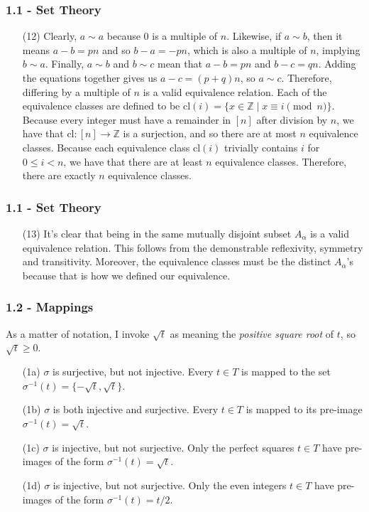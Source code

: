 \documentclass{beamer}
\begin{document}
\begin{frame}
\frametitle{1.1 - Set Theory}
\small
\begin{enumerate}
	\item[(12)] Clearly, $a\sim a$ because $0$ is a multiple of $n$. Likewise, if $a\sim b$, then it means $a - b = pn$ and so $b - a = -pn$, which is also a multiple of $n$, implying $b \sim a$. Finally, $a\sim b$ and $b\sim c$ mean that $a - b = pn$ and $b - c = qn$. Adding the equations together gives us $a - c = (p + q)n$, so $a\sim c$. Therefore, differing by a multiple of $n$ is a valid equivalence relation. Each of the equivalence classes are defined to be $\text{cl}(i) = \{x\in \mathbb Z \mid x\equiv i\pmod{n}\}$. Because every integer must have a remainder in $[n]$ after division by $n$, we have that $\text{cl}: [n] \to \mathbb Z$ is a surjection, and so there are at most $n$ equivalence classes. Because each equivalence class $\text{cl}(i)$ trivially contains $i$ for $0\leq i < n$, we have that there are at least $n$ equivalence classes. Therefore, there are exactly $n$ equivalence classes.
\end{enumerate}
\end{frame}
\begin{frame}
\frametitle{1.1 - Set Theory}
\small
\begin{enumerate}
	\item[(13)] It's clear that being in the same mutually disjoint subset $A_\alpha$ is a valid equivalence relation. This follows from the demonstrable reflexivity, symmetry and transitivity. Moreover, the equivalence classes must be the distinct $A_\alpha$'s because that is how we defined our equivalence.
\end{enumerate}
\end{frame}
\begin{frame}
\frametitle{1.2 - Mappings}
\small
As a matter of notation, I invoke $\sqrt{t}$ as meaning the \textit{positive square root} of $t$, so $\sqrt{t} \geq 0$.
\begin{enumerate}
	\item[(1a)] $\sigma$ is surjective, but not injective. Every $t\in T$ is mapped to the set $\sigma^{-1}(t) = \{-\sqrt{t}, \sqrt{t}\}$.
	\item[(1b)] $\sigma$ is both injective and surjective. Every $t\in T$ is mapped to its pre-image $\sigma^{-1}(t) = \sqrt{t}$.
	\item[(1c)] $\sigma$ is injective, but not surjective. Only the perfect squares $t\in T$ have pre-images of the form $\sigma^{-1}(t) = \sqrt{t}$.
	\item[(1d)] $\sigma$ is injective, but not surjective. Only the even integers $t\in T$ have pre-images of the form $\sigma^{-1}(t) = t/2$.
\end{enumerate}
\end{frame}
\end{document}
